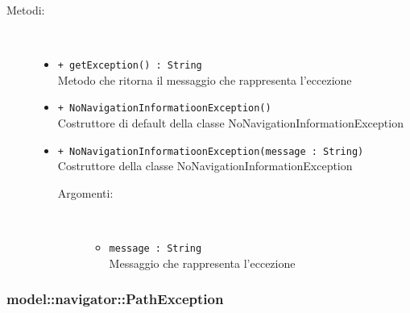 \documentclass[../DefinizioneDiProdotto.tex]{subfiles}
\begin{document}
\begin{description}
\begin{itemize}
\end{itemize}
\item[Metodi:] \
\begin{itemize}
\item \texttt{+ getException() : String}\\
Metodo che ritorna il messaggio che rappresenta l'eccezione
 \item \texttt{+ NoNavigationInformatioonException()}\\
Costruttore di default della classe NoNavigationInformationException
 \item \texttt{+ NoNavigationInformatioonException(message : String)}\\
Costruttore della classe NoNavigationInformationException
 \begin{description}
\item[Argomenti:] \
\begin{itemize}
\item \texttt{message : String}\\
Messaggio che rappresenta l'eccezione\end{itemize}
\end{description}
\end{itemize}
\end{description}

\subsubsection{model::navigator::PathException}
\end{document}
